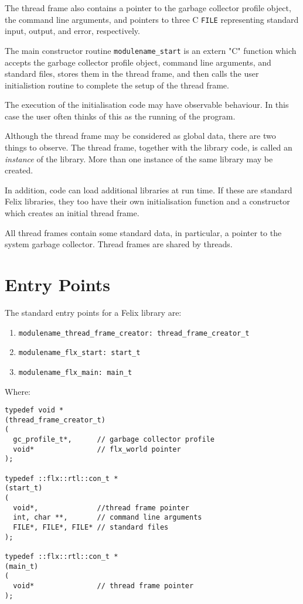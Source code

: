 \documentclass[oneside]{book}
\begin{document}
The thread frame also contains a pointer to the garbage collector profile
object, the command line arguments, and pointers to three C \verb$FILE$ representing standard input,
output, and error, respectively.

The main constructor routine \verb$modulename_start$ is an extern "C" 
function which accepts the garbage collector profile object, command line arguments,
and standard files, stores them in the thread frame, and then calls the user initialistion
routine to complete the setup of the thread frame.

The execution of the initialisation code may have observable behaviour.
In this case the user often thinks of this as the running of the program.

Although the thread frame may be considered as global data, there are two
things to observe. The thread frame, together with the library code,
is called an {\em instance} of the library. More than one instance
of the same library may be created.

In addition, code can load additional libraries at run time. If these are
standard Felix libraries, they too have their own initialisation function
and a constructor which creates an initial thread frame.

All thread frames contain some standard data, in particular, a pointer
to the system garbage collector. Thread frames are shared by threads.
\section{Entry Points}
The standard entry points for a Felix library are:

\begin{enumerate}
\item \verb$modulename_thread_frame_creator: thread_frame_creator_t$
\item \verb$modulename_flx_start: start_t$
\item \verb$modulename_flx_main: main_t$
\end{enumerate}

Where:

\begin{verbatim}
typedef void *
(thread_frame_creator_t)
(
  gc_profile_t*,      // garbage collector profile
  void*               // flx_world pointer
);

typedef ::flx::rtl::con_t *
(start_t)
(
  void*,              //thread frame pointer 
  int, char **,       // command line arguments
  FILE*, FILE*, FILE* // standard files 
);

typedef ::flx::rtl::con_t *
(main_t)
(
  void*               // thread frame pointer
);
\end{verbatim}
\end{document}
